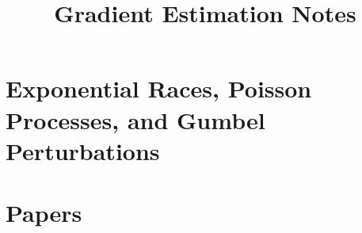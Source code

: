 \documentclass{article}
\title{Gradient Estimation Notes}
\begin{document}
\maketitle

















\newpage
\setcounter{section}{0}
\part*{Exponential Races, Poisson Processes, and Gumbel Perturbations}



\newpage
\setcounter{section}{0}
\part*{Papers}





\newpage


\end{document}
